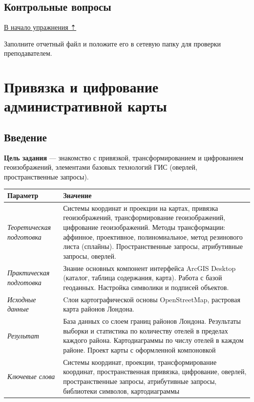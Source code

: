 \documentclass[]{book}
\theoremstyle{definition}
\theoremstyle{definition}
\theoremstyle{definition}
\theoremstyle{remark}
\begin{document}
\hypertarget{map-ref-hydrogeologic-questions}{%
\section{Контрольные вопросы}\label{map-ref-hydrogeologic-questions}}

\protect\hyperlink{map-ref-hydrogeologic}{В начало упражнения ⇡}

Заполните отчетный файл и положите его в сетевую папку для проверки
преподавателем.

\hypertarget{map-ref-economic}{%
\chapter{Привязка и цифрование административной
карты}\label{map-ref-economic}}

\hypertarget{map-ref-economic-intro}{%
\section{Введение}\label{map-ref-economic-intro}}

\textbf{Цель задания} --- знакомство с привязкой, трансформированием и
цифрованием геоизображений, элементами базовых технологий ГИС (оверлей,
пространственные запросы).

\begin{longtable}[]{@{}ll@{}}
\toprule
Параметр & Значение\tabularnewline
\midrule
\endhead
\emph{Теоретическая подготовка} & Системы координат и проекции на
картах, привязка геоизображений, трансформирование геоизображений,
цифрование геоизображений. Методы трансформации: аффинное, проективное,
полиномиальное, метод резинового листа (сплайны). Пространственные
запросы, атрибутивные запросы, оверлей.\tabularnewline
\emph{Практическая подготовка} & Знание основных компонент интерфейса
ArcGIS Desktop (каталог, таблица содержания, карта). Работа с базой
геоданных. Настройка символики и подписей объектов.\tabularnewline
\emph{Исходные данные} & Cлои картографической основы OpenStreetMap,
растровая карта районов Лондона.\tabularnewline
\emph{Результат} & База данных со слоем границ районов Лондона.
Результаты выборки и статистика по количеству отелей в пределах каждого
района. Картодиаграммы по числу отелей в каждом районе. Проект карты с
оформленной компоновкой\tabularnewline
\emph{Ключевые слова} & Системы координат, проекции, трансформирование
координат, пространственная привязка, цифрование, оверлей,
пространственные запросы, атрибутивные запросы, библиотеки символов,
картодиаграммы\tabularnewline
\bottomrule
\end{longtable}
\end{document}
